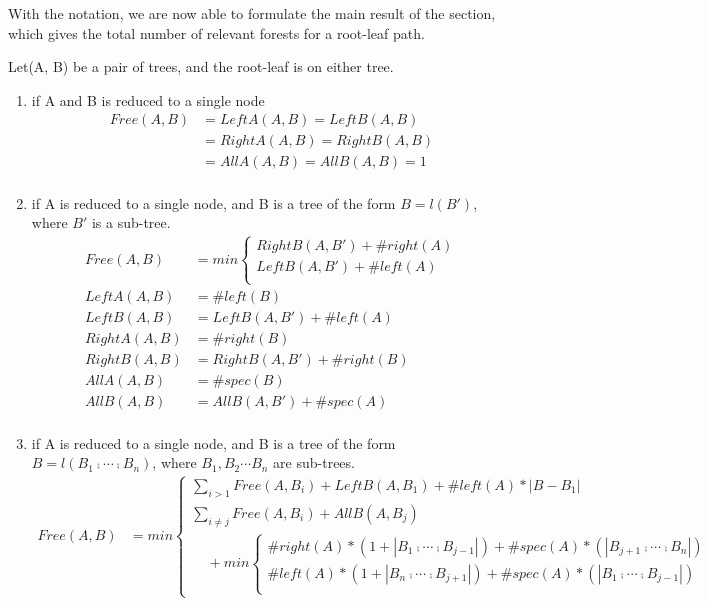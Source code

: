 With the notation, we are now able to formulate the main result of the section, which gives the total number of relevant forests for a root-leaf path.
\begin{theorem}
Let(A, B) be a pair of trees, and the root-leaf is on either tree.
\begin{enumerate}
\item if A and B is reduced to a single node 
\begin{align*}
Free(A, B) &= LeftA(A, B) = LeftB(A, B)\\ 
&= RightA(A, B) = RightB(A, B)\\
&= AllA(A, B) = AllB(A, B) = 1\\
\end{align*}
\item if A is reduced to a single node, and B is a tree of the form $B = l(B')$, where $B'$ is a sub-tree.
\begin{align*}
Free(A, B) &= min \begin{cases}
			RightB(A, B') + \#right(A)\\
			LeftB(A, B') + \#left(A)\\
			\end{cases}\\
LeftA(A, B) &= \#left(B)\\
LeftB(A, B) &= LeftB(A, B') + \#left(A)\\
RightA(A, B) &= \#right(B)\\
RightB(A, B) &= RightB(A, B') + \#right(B)\\
AllA(A, B) &= \#spec(B)\\
AllB(A, B) &= AllB(A, B') + \#spec(A)\\
\end{align*}
\item if A is reduced to a single node, and B is a tree of the form $B = l(B_1 \comp \cdots \comp B_n)$, where $B_1, B_2 \cdots B_n$ are sub-trees.
\begin{align*}
Free(A, B) &= min \begin{cases}
			\sum_{i>1}Free(A, B_i) + LeftB(A, B_1) + \#left(A) * \left\vert  B - B_1 \right\vert \\
			\sum_{i \neq j}Free(A, B_i) + AllB(A, B_j) \\
			\ \ \ \ \ + min \begin{cases}
			\#right(A) * (1 + \left\vert B_1 \comp \cdots \comp B_{j-1} \right\vert) + \#spec(A) * (\left\vert B_{j+1} \comp \cdots \comp B_n \right\vert) \\
			\#left(A) * (1 + \left\vert B_n \comp \cdots \comp B_{j+1} \right\vert) + \#spec(A) * (\left\vert B_1 \comp \cdots \comp B_{j-1} \right\vert) \\

\end{cases}
\end{cases}
\end{align*}
\end{enumerate}
\end{theorem}
